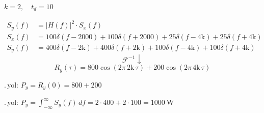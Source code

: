 \documentclass[11pt,a4paper]{article}
\begin{document}
\noindent $k=2,\quad t_d=10$

\noindent
{}
\begin{align*}
S_y(f)&=|H(f)|^2\cdot S_x(f)\\
S_x(f)&=100\delta(f-2000)+100\delta(f+2000)+25\delta(f-4\mathrm{k})+25\delta(f+4\mathrm{k})\\
S_y(f)&=400\delta(f-2\mathrm{k})+400\delta(f+2\mathrm{k})+100\delta(f-4\mathrm{k})+100\delta(f+4\mathrm{k})
\end{align*}
\[ \mathcal{F}^{-1}\downarrow \]
\[ R_y(\tau)=800\cos(2\pi\,2\mathrm{k}\,\tau)+200\cos(2\pi\,4\mathrm{k}\,\tau) \]

.\,yol: $P_y=R_y(0)=800+200$

.\,yol: $P_y=\displaystyle\int_{-\infty}^{\infty}S_y(f)\,df=2\cdot400+2\cdot100=1000\ \mathrm{W}$
\end{document}

